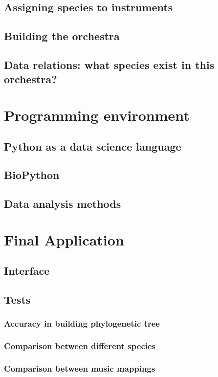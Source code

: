 \documentclass[11pt,twoside,a4paper]{report}
\begin{document}
\section{Assigning species to instruments}
\section{Building the orchestra}
\section{Data relations: what species exist in this orchestra?}

\chapter{Programming environment}
\section{Python as a data science language}
\section{BioPython}
\section{Data analysis methods}

\chapter{Final Application}
\section{Interface}
\section{Tests}
\subsection{Accuracy in building phylogenetic tree}
\subsection{Comparison between different species}
\subsection{Comparison between music mappings}
\end{document}
